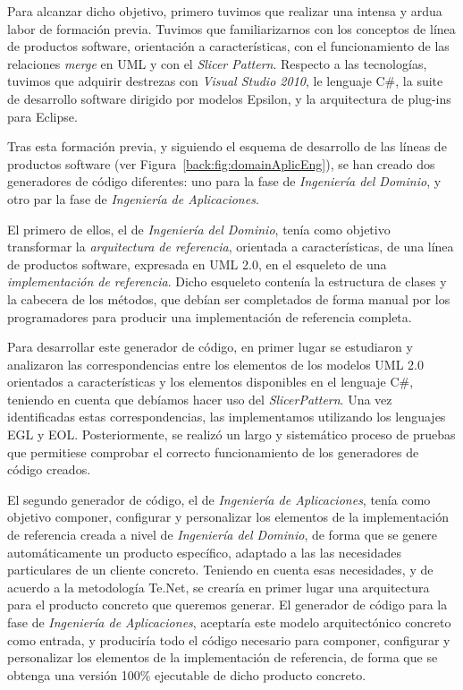 Para alcanzar dicho objetivo, primero tuvimos que realizar una intensa y ardua labor de formación previa. Tuvimos que familiarizarnos con los conceptos de línea de productos software, orientación a características, con el funcionamiento de las relaciones \emph{merge} en UML y con el \emph{Slicer Pattern}. Respecto a las tecnologías, tuvimos que adquirir destrezas con \emph{Visual Studio 2010}, le lenguaje C\#, la suite de desarrollo software dirigido por modelos Epsilon, y la arquitectura de plug-ins para Eclipse. 

Tras esta formación previa, y siguiendo el esquema de desarrollo de las líneas de productos software (ver Figura~\ref{back:fig:domainAplicEng}), se han creado dos generadores de código diferentes: uno para la fase de \emph{Ingeniería del Dominio}, y otro par la fase de \emph{Ingeniería de Aplicaciones}.

El primero de ellos, el de \emph{Ingeniería del Dominio}, tenía como objetivo transformar la \emph{arquitectura de referencia}, orientada a características, de una línea de productos software, expresada en UML 2.0, en el esqueleto de una \emph{implementación de referencia}. Dicho esqueleto contenía la estructura de clases y la cabecera de los métodos, que debían ser completados de forma manual por los programadores para producir una implementación de referencia completa. 

Para desarrollar este generador de código, en primer lugar se estudiaron y analizaron las correspondencias entre los elementos de los modelos UML 2.0 orientados a características y los elementos disponibles en el lenguaje C\#, teniendo en cuenta que debíamos hacer uso del \emph{SlicerPattern}. Una vez identificadas estas correspondencias, las implementamos utilizando los lenguajes EGL y EOL. Posteriormente, se realizó un largo y sistemático proceso de pruebas que permitiese comprobar el correcto funcionamiento de los generadores de código creados. 

El segundo generador de código, el de \emph{Ingeniería de Aplicaciones}, tenía como objetivo componer, configurar y personalizar los elementos de la implementación de referencia creada a nivel de \emph{Ingeniería del Dominio}, de forma que se genere automáticamente un producto específico, adaptado a las las necesidades particulares de un cliente concreto. Teniendo en cuenta esas necesidades, y de acuerdo a la metodología Te.Net, se crearía en primer lugar una arquitectura para el producto concreto que queremos generar. El generador de código para la fase de \emph{Ingeniería de Aplicaciones}, aceptaría este modelo arquitectónico concreto como entrada, y produciría todo el código necesario para componer, configurar y personalizar los elementos de la implementación de referencia, de forma que se obtenga una versión 100\% ejecutable de dicho producto concreto. 

